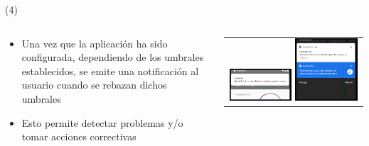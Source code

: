 \begin{frame}{ (4)}
\begin{columns}
\begin{column}{0.40\textwidth}
\begin{itemize}
        \item Una vez que la aplicación ha sido configurada, dependiendo de los umbrales establecidos, se emite una notificación al usuario cuando se rebazan dichos umbrales
        \item Esto permite detectar problemas y/o tomar acciones correctivas
	\end{itemize}
\end{column}
\begin{column}{0.60\textwidth}  
\begin{center}
     \begin{tabular}{c}
\includegraphics[width=0.48\textwidth]{2021_IoT_JoseRamon/figs/Alerta humedad.png}
\includegraphics[width=0.48\textwidth]{2021_IoT_JoseRamon/figs/Alerta Temperatura.png}\\
          \end{tabular}
\end{center}
\end{column} 
\end{columns} 
\end{frame}






